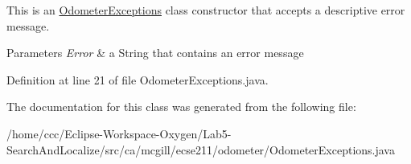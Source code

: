 This is an \hyperlink{classca_1_1mcgill_1_1ecse211_1_1odometer_1_1_odometer_exceptions}{Odometer\+Exceptions} class constructor that accepts a descriptive error message.


\begin{DoxyParams}{Parameters}
{\em Error} & a String that contains an error message \\
\hline
\end{DoxyParams}


Definition at line 21 of file Odometer\+Exceptions.\+java.



The documentation for this class was generated from the following file\+:\begin{DoxyCompactItemize}
\item 
/home/ccc/\+Eclipse-\/\+Workspace-\/\+Oxygen/\+Lab5-\/\+Search\+And\+Localize/src/ca/mcgill/ecse211/odometer/Odometer\+Exceptions.\+java\end{DoxyCompactItemize}
